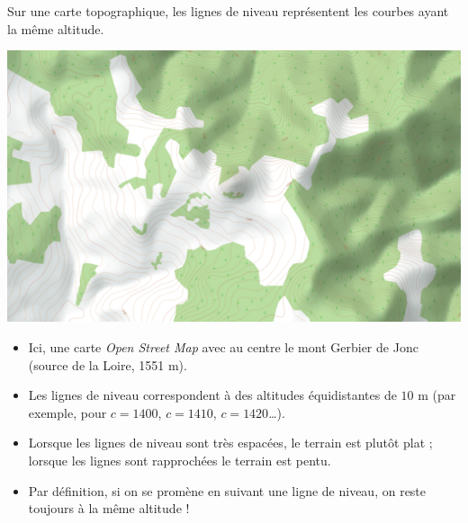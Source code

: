 \documentclass[11pt,class=report,crop=false]{standalone}
\begin{document}
\begin{exemple}
Sur une carte topographique, les lignes de niveau représentent les courbes ayant la même altitude. 
\begin{center}
  \includegraphics[scale=0.3]{figures/fig-fonctions-topo}
\end{center}
\begin{itemize}
  \item Ici, une carte \emph{Open Street Map} avec au centre le mont Gerbier de Jonc (source de la Loire, 1551 m). 
  \item Les lignes de niveau correspondent à des altitudes équidistantes de $10$ m (par exemple, pour $c=1400$, $c=1410$, $c=1420$\ldots).
  \item Lorsque les lignes de niveau sont très espacées, le terrain est plutôt plat ; lorsque les lignes sont rapprochées le terrain est pentu.
  \item Par définition, si on se promène en suivant une ligne de niveau, on reste toujours à la même altitude !
\end{itemize}
\end{exemple}
\end{document}
